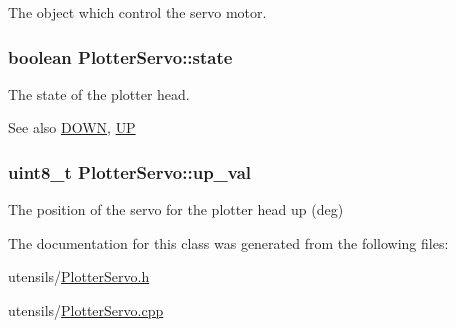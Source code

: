 The object which control the servo motor. 

\hypertarget{class_plotter_servo_a3309473d867ae37982f1ff0caba0c86b}{
\subsubsection[{state}]{\setlength{\rightskip}{0pt plus 5cm}boolean Plotter\+Servo\+::state\hspace{0.3cm}{\ttfamily [private]}}}\label{class_plotter_servo_a3309473d867ae37982f1ff0caba0c86b}


The state of the plotter head. 

\begin{DoxySeeAlso}{See also}
\hyperlink{_plotter_servo_8h_a4193cd1c8c2e6ebd0e056fa2364a663f}{D\+O\+W\+N}, \hyperlink{_plotter_servo_8h_a1965eaca47dbf3f87acdafc2208f04eb}{U\+P} 
\end{DoxySeeAlso}
\hypertarget{class_plotter_servo_ac5a8cf60736715222a53a774c4e077f7}{
\subsubsection[{up\+\_\+val}]{\setlength{\rightskip}{0pt plus 5cm}uint8\+\_\+t Plotter\+Servo\+::up\+\_\+val\hspace{0.3cm}{\ttfamily [private]}}}\label{class_plotter_servo_ac5a8cf60736715222a53a774c4e077f7}


The position of the servo for the plotter head up (deg) 



The documentation for this class was generated from the following files\+:\begin{DoxyCompactItemize}
\item 
utensils/\hyperlink{_plotter_servo_8h}{Plotter\+Servo.\+h}\item 
utensils/\hyperlink{_plotter_servo_8cpp}{Plotter\+Servo.\+cpp}\end{DoxyCompactItemize}
